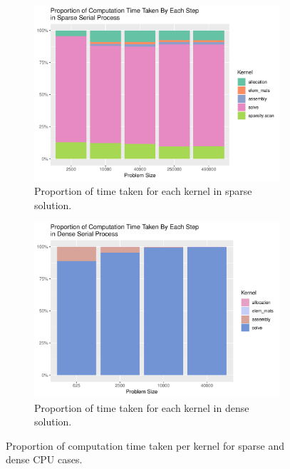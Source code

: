 \begin{figure}
	\centering
	\begin{subfigure}{0.48\linewidth}
		\centering
		\includegraphics[width = \linewidth]{Plots/prop_sparse}
		\caption{Proportion of time taken for each kernel in sparse solution.}
		\label{fig:prop_sparse}
	\end{subfigure}\hfill
	\begin{subfigure}{0.48\linewidth}
		\centering
		\includegraphics[width=\linewidth]{Plots/prop_dense}
		\caption{Proportion of time taken for each kernel in dense solution.}
		\label{fig:prop_dense_cpu}
	\end{subfigure}
	\caption{Proportion of computation time taken per kernel for sparse and dense CPU cases.}
	\label{fig:prop_cpu}
\end{figure}

